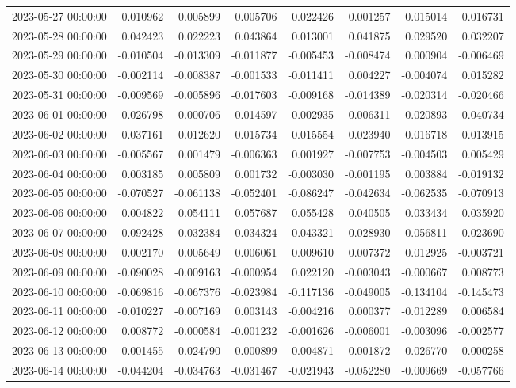 \begin{tabular}{lrrrrrrr}
2023-05-27 00:00:00 & 0.010962 & 0.005899 & 0.005706 & 0.022426 & 0.001257 & 0.015014 & 0.016731 \\
2023-05-28 00:00:00 & 0.042423 & 0.022223 & 0.043864 & 0.013001 & 0.041875 & 0.029520 & 0.032207 \\
2023-05-29 00:00:00 & -0.010504 & -0.013309 & -0.011877 & -0.005453 & -0.008474 & 0.000904 & -0.006469 \\
2023-05-30 00:00:00 & -0.002114 & -0.008387 & -0.001533 & -0.011411 & 0.004227 & -0.004074 & 0.015282 \\
2023-05-31 00:00:00 & -0.009569 & -0.005896 & -0.017603 & -0.009168 & -0.014389 & -0.020314 & -0.020466 \\
2023-06-01 00:00:00 & -0.026798 & 0.000706 & -0.014597 & -0.002935 & -0.006311 & -0.020893 & 0.040734 \\
2023-06-02 00:00:00 & 0.037161 & 0.012620 & 0.015734 & 0.015554 & 0.023940 & 0.016718 & 0.013915 \\
2023-06-03 00:00:00 & -0.005567 & 0.001479 & -0.006363 & 0.001927 & -0.007753 & -0.004503 & 0.005429 \\
2023-06-04 00:00:00 & 0.003185 & 0.005809 & 0.001732 & -0.003030 & -0.001195 & 0.003884 & -0.019132 \\
2023-06-05 00:00:00 & -0.070527 & -0.061138 & -0.052401 & -0.086247 & -0.042634 & -0.062535 & -0.070913 \\
2023-06-06 00:00:00 & 0.004822 & 0.054111 & 0.057687 & 0.055428 & 0.040505 & 0.033434 & 0.035920 \\
2023-06-07 00:00:00 & -0.092428 & -0.032384 & -0.034324 & -0.043321 & -0.028930 & -0.056811 & -0.023690 \\
2023-06-08 00:00:00 & 0.002170 & 0.005649 & 0.006061 & 0.009610 & 0.007372 & 0.012925 & -0.003721 \\
2023-06-09 00:00:00 & -0.090028 & -0.009163 & -0.000954 & 0.022120 & -0.003043 & -0.000667 & 0.008773 \\
2023-06-10 00:00:00 & -0.069816 & -0.067376 & -0.023984 & -0.117136 & -0.049005 & -0.134104 & -0.145473 \\
2023-06-11 00:00:00 & -0.010227 & -0.007169 & 0.003143 & -0.004216 & 0.000377 & -0.012289 & 0.006584 \\
2023-06-12 00:00:00 & 0.008772 & -0.000584 & -0.001232 & -0.001626 & -0.006001 & -0.003096 & -0.002577 \\
2023-06-13 00:00:00 & 0.001455 & 0.024790 & 0.000899 & 0.004871 & -0.001872 & 0.026770 & -0.000258 \\
2023-06-14 00:00:00 & -0.044204 & -0.034763 & -0.031467 & -0.021943 & -0.052280 & -0.009669 & -0.057766 \\

\end{tabular}
